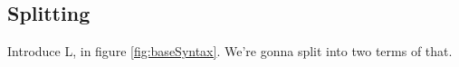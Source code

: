 \documentclass{article}
\newcommand {\coremono} {L}
\newcommand {\next} {{\tt next}}
\newcommand {\prev} {{\tt prev}}
\newcommand {\gds} {{\Gamma \vdash^\sigma}}
\newcommand {\letin} [3] {{\tt let}~{#1} = {#2}~{\tt in}~{#3}}
\newcommand {\ifthen} [3] {{\tt if}~{#1} ~{\tt then}~{#2}~{\tt else}~{#3}}
\newcommand {\valdum} {{\bf dummy}}
\begin{document}

%

\subsection{Splitting}

Introduce \coremono, in figure \ref{fig:baseSyntax}.  We're gonna split into two terms of that.
\end{document}

